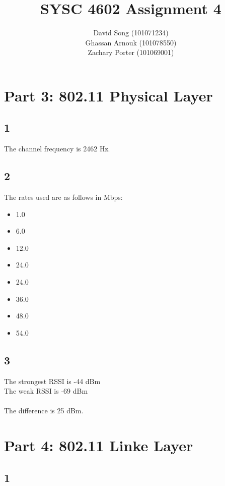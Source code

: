 \documentclass{article}
\begin{document}
    \title  { \textbf{SYSC 4602 Assignment 4} }
    \author {
        David Song (101071234)\\
        Ghassan Arnouk (101078550)\\
        Zachary Porter (101069001)
    }
     
    \maketitle
    
    \clearpage
    \section*{Part 3: 802.11 Physical Layer}
    \subsection*{1}
    The channel frequency is 2462 Hz.
    \subsection*{2}
    The rates used are as follows in Mbps:
    \begin{itemize}
        \item 1.0
        \item 6.0
        \item 12.0
        \item 24.0
        \item 24.0
        \item 36.0
        \item 48.0
        \item 54.0
    \end{itemize}
    \subsection*{3}
    The strongest RSSI is -44 dBm \\
    The weak RSSI is -69 dBm \\
    \\
    The difference is 25 dBm. \\

    \section*{Part 4: 802.11 Linke Layer}
    \subsection*{1}
\end{document}
